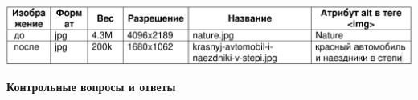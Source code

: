 \noindent
\begin{minipage}{\linewidth}
\end{minipage}
\bigskip

\noindent
\begin{minipage}{\linewidth}
    \includegraphics[width=\linewidth]{table2}
\end{minipage}
\bigskip

\textbf{Контрольные вопросы и ответы}


